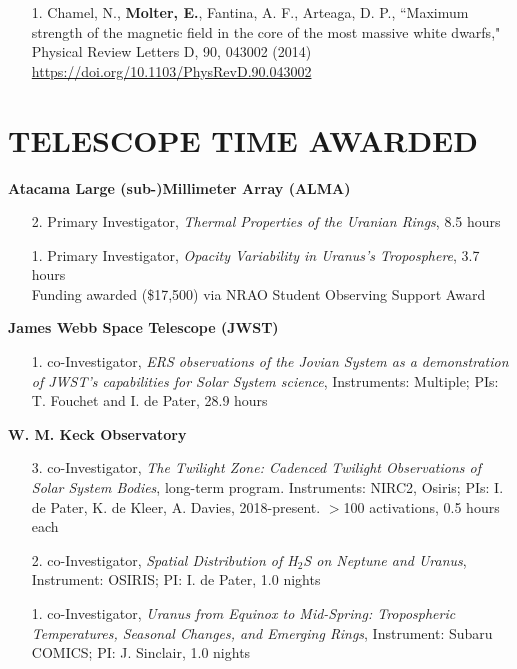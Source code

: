\documentclass[margin, 10pt]{res} %
\begin{document}
\begin{resume}
{\begin{enumerate}
\item[1.] Chamel, N., {\bf Molter, E.}, Fantina, A. F., Arteaga, D. P., ``Maximum strength of the magnetic field in the core of the most massive white dwarfs," Physical Review Letters D, 90, 043002 (2014) \url{https://doi.org/10.1103/PhysRevD.90.043002}
\end{enumerate}

}{}

\section{TELESCOPE TIME AWARDED}


\textbf{Atacama Large (sub-)Millimeter Array (ALMA)} 
\begin{enumerate}
	\item[2.] Primary Investigator, {\it Thermal Properties of the Uranian Rings}, 8.5 hours %
	\item[1.] Primary Investigator, {\it Opacity Variability in Uranus's Troposphere}, 3.7 hours \\ Funding awarded (\$17,500) via NRAO Student Observing Support Award %
\end{enumerate}
\vspace{-0.3cm}
\textbf{James Webb Space Telescope (JWST)} 
\begin{enumerate}
	\item[1.] co-Investigator, {\it ERS observations of the Jovian System as a demonstration of JWST's capabilities for Solar System science}, Instruments: Multiple; PIs: T. Fouchet and I. de Pater, 28.9 hours %
\end{enumerate}
\vspace{-0.3cm}
\textbf{W. M. Keck Observatory} 
\begin{enumerate}
	\item[3.] co-Investigator, {\it The Twilight Zone: Cadenced Twilight Observations of Solar System Bodies}, long-term program. Instruments: NIRC2, Osiris; PIs: I. de Pater, K. de Kleer, A. Davies, 2018-present. $>$100 activations, 0.5 hours each %
	\item[2.] co-Investigator, {\it Spatial Distribution of H$_2$S on Neptune and Uranus}, Instrument: OSIRIS; PI: I. de Pater, 1.0 nights %
	\item[1.] co-Investigator, {\it Uranus from Equinox to Mid-Spring: Tropospheric Temperatures, Seasonal Changes, and Emerging Rings}, Instrument: Subaru COMICS; PI: J. Sinclair, 1.0 nights %

\end{enumerate}
\end{resume}
\end{document}
